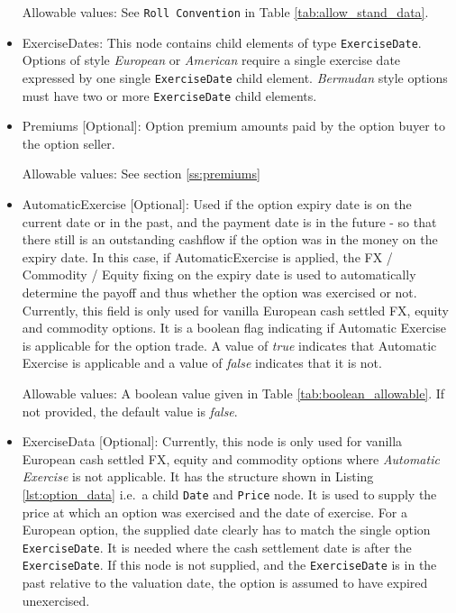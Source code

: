 \begin{itemize}
  Allowable values: See \lstinline!Roll Convention! in Table \ref{tab:allow_stand_data}.

\item ExerciseDates: This node contains child elements of type
  \lstinline!ExerciseDate!.  Options of style \emph{European} or
  \emph{American} require a single exercise date expressed by one
  single \lstinline!ExerciseDate! child element.  \emph{Bermudan}
  style options must have two or more \lstinline!ExerciseDate! child
  elements.

\item Premiums [Optional]: Option premium amounts paid by the option buyer to the option seller.

Allowable values:  See section \ref{ss:premiums}

\item AutomaticExercise [Optional]: Used if the option expiry date is on the current date or in the past, and the payment date is in the future  - so that there still is an outstanding cashflow if the option was in the money on the expiry date. In this case, if AutomaticExercise is applied, the FX / Commodity / Equity fixing on the expiry date is used to automatically determine the payoff and thus whether the option was exercised or not.\\
\medskip
Currently, this field is only used for vanilla European cash settled FX, equity and commodity options. It is a boolean flag indicating if Automatic Exercise is applicable for the option trade. A value of \emph{true} indicates that Automatic Exercise is applicable and a value of \emph{false} indicates that it is not.

Allowable values: A boolean value given in Table \ref{tab:boolean_allowable}. If not provided, the default value is \emph{false}.

\item ExerciseData [Optional]: Currently, this node is only used for vanilla European cash settled FX, equity and commodity options where \textit{Automatic Exercise} is not applicable. It has the structure shown in Listing \ref{lst:option_data} i.e.\ a child \lstinline!Date! and \lstinline!Price! node. It is used to supply the price at which an option was exercised and the date of exercise. For a European option, the supplied date clearly has to match the single option \lstinline!ExerciseDate!. It is needed where the cash settlement date is after the \lstinline!ExerciseDate!. If this node is not supplied, and the \lstinline!ExerciseDate! is in the past relative to the valuation date, the option is assumed to have expired unexercised.


\end{itemize}
